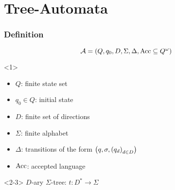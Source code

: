 \documentclass{beamer}
\begin{document}
  \section{Tree-Automata}
  \begin{frame}
    \frametitle{Definition}
    \begin{equation*}
      \mathcal{A} = \left(Q, q_{0}, D, \Sigma, \Delta,
        \operatorname{Acc}\subseteq Q^{\omega}\right)
    \end{equation*}
    \begin{overlayarea}{\textwidth}{0.8\textheight}
      \begin{onlyenv}<1>
        \begin{itemize}
          \item $Q$: finite state set
          \item $q_{0}\in Q$: initial state
          \item $D$: finite set of directions
          \item $\Sigma$: finite alphabet
          \item $\Delta$: transitions of the form
              $\left(q, \sigma, \left(q_{d}\right)_{d\in D}\right)$
          \item $\operatorname{Acc}$: accepted language
        \end{itemize}
      \end{onlyenv}
      \begin{onlyenv}<2-3>
        $D$-ary $\Sigma$-tree: $t:D^{*}\rightarrow\Sigma$\hfill
        \begin{center}
        \end{center}
      \end{onlyenv}
    \end{overlayarea}
  \end{frame}
\end{document}
